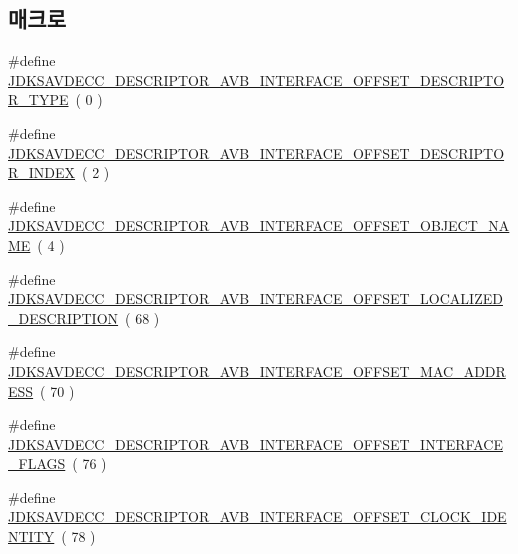 \subsection*{매크로}
\begin{DoxyCompactItemize}
\item 
\#define \hyperlink{group__descriptor__avb__interface_ga600a2ceea70b7954d4bca3f20b651dc8}{J\+D\+K\+S\+A\+V\+D\+E\+C\+C\+\_\+\+D\+E\+S\+C\+R\+I\+P\+T\+O\+R\+\_\+\+A\+V\+B\+\_\+\+I\+N\+T\+E\+R\+F\+A\+C\+E\+\_\+\+O\+F\+F\+S\+E\+T\+\_\+\+D\+E\+S\+C\+R\+I\+P\+T\+O\+R\+\_\+\+T\+Y\+PE}~( 0 )
\item 
\#define \hyperlink{group__descriptor__avb__interface_ga2a302d451d7181a80fcbc34b67bb28e7}{J\+D\+K\+S\+A\+V\+D\+E\+C\+C\+\_\+\+D\+E\+S\+C\+R\+I\+P\+T\+O\+R\+\_\+\+A\+V\+B\+\_\+\+I\+N\+T\+E\+R\+F\+A\+C\+E\+\_\+\+O\+F\+F\+S\+E\+T\+\_\+\+D\+E\+S\+C\+R\+I\+P\+T\+O\+R\+\_\+\+I\+N\+D\+EX}~( 2 )
\item 
\#define \hyperlink{group__descriptor__avb__interface_ga41bdec521dbd8fb5e74d3abe24497cc8}{J\+D\+K\+S\+A\+V\+D\+E\+C\+C\+\_\+\+D\+E\+S\+C\+R\+I\+P\+T\+O\+R\+\_\+\+A\+V\+B\+\_\+\+I\+N\+T\+E\+R\+F\+A\+C\+E\+\_\+\+O\+F\+F\+S\+E\+T\+\_\+\+O\+B\+J\+E\+C\+T\+\_\+\+N\+A\+ME}~( 4 )
\item 
\#define \hyperlink{group__descriptor__avb__interface_ga8c122b513ffc4c4d603df108995e7156}{J\+D\+K\+S\+A\+V\+D\+E\+C\+C\+\_\+\+D\+E\+S\+C\+R\+I\+P\+T\+O\+R\+\_\+\+A\+V\+B\+\_\+\+I\+N\+T\+E\+R\+F\+A\+C\+E\+\_\+\+O\+F\+F\+S\+E\+T\+\_\+\+L\+O\+C\+A\+L\+I\+Z\+E\+D\+\_\+\+D\+E\+S\+C\+R\+I\+P\+T\+I\+ON}~( 68 )
\item 
\#define \hyperlink{group__descriptor__avb__interface_ga74e72a571e5b25583bd0900a5adfde1a}{J\+D\+K\+S\+A\+V\+D\+E\+C\+C\+\_\+\+D\+E\+S\+C\+R\+I\+P\+T\+O\+R\+\_\+\+A\+V\+B\+\_\+\+I\+N\+T\+E\+R\+F\+A\+C\+E\+\_\+\+O\+F\+F\+S\+E\+T\+\_\+\+M\+A\+C\+\_\+\+A\+D\+D\+R\+E\+SS}~( 70 )
\item 
\#define \hyperlink{group__descriptor__avb__interface_ga732ae25c522dd413e69a31444f0371bf}{J\+D\+K\+S\+A\+V\+D\+E\+C\+C\+\_\+\+D\+E\+S\+C\+R\+I\+P\+T\+O\+R\+\_\+\+A\+V\+B\+\_\+\+I\+N\+T\+E\+R\+F\+A\+C\+E\+\_\+\+O\+F\+F\+S\+E\+T\+\_\+\+I\+N\+T\+E\+R\+F\+A\+C\+E\+\_\+\+F\+L\+A\+GS}~( 76 )
\item 
\#define \hyperlink{group__descriptor__avb__interface_ga1cc78ff4c9e5d72a289d83d1606071ec}{J\+D\+K\+S\+A\+V\+D\+E\+C\+C\+\_\+\+D\+E\+S\+C\+R\+I\+P\+T\+O\+R\+\_\+\+A\+V\+B\+\_\+\+I\+N\+T\+E\+R\+F\+A\+C\+E\+\_\+\+O\+F\+F\+S\+E\+T\+\_\+\+C\+L\+O\+C\+K\+\_\+\+I\+D\+E\+N\+T\+I\+TY}~( 78 )
\item 

\end{DoxyCompactItemize}
